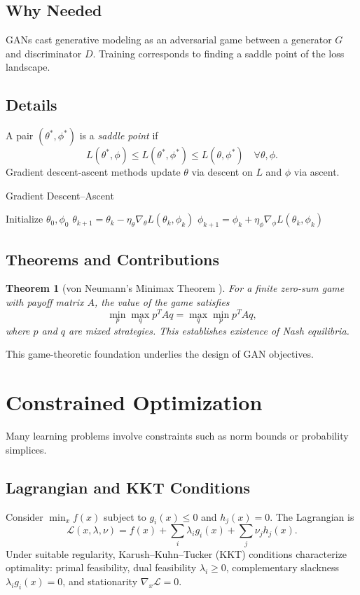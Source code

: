 \documentclass[11pt]{book}
\newtheorem{theorem}{Theorem}[chapter]
\begin{document}
\subsection{Why Needed}
GANs cast generative modeling as an adversarial game between a generator $G$ and discriminator $D$. Training corresponds to finding a saddle point of the loss landscape.

\subsection{Details}
A pair $(\theta^*,\phi^*)$ is a \emph{saddle point} if
\begin{equation}
L(\theta^*,\phi)\le L(\theta^*,\phi^*)\le L(\theta,\phi^*)\quad\forall\theta,\phi.
\end{equation}
Gradient descent-ascent methods update $\theta$ via descent on $L$ and $\phi$ via ascent.

\begin{algorithm}
\caption{Gradient Descent--Ascent}
\begin{algorithmic}[1]
\STATE Initialize $\theta_0, \phi_0$
    \STATE $\theta_{k+1}=\theta_k-\eta_\theta\nabla_{\theta}L(\theta_k,\phi_k)$
    \STATE $\phi_{k+1}=\phi_k+\eta_\phi\nabla_{\phi}L(\theta_k,\phi_k)$
\ENDFOR
\end{algorithmic}
\end{algorithm}

\subsection{Theorems and Contributions}
\begin{theorem}[von Neumann's Minimax Theorem \cite{vonneumann1928}]
For a finite zero-sum game with payoff matrix $A$, the value of the game satisfies
\begin{equation}
\min_{p}\max_{q} p^T A q = \max_{q}\min_{p} p^T A q,
\end{equation}
where $p$ and $q$ are mixed strategies. This establishes existence of Nash equilibria.
\end{theorem}
This game-theoretic foundation underlies the design of GAN objectives.

\section{Constrained Optimization}
Many learning problems involve constraints such as norm bounds or probability simplices.
\subsection{Lagrangian and KKT Conditions}
Consider $\min_x f(x)$ subject to $g_i(x)\le0$ and $h_j(x)=0$. The Lagrangian is
\begin{equation}
\mathcal{L}(x,\lambda,\nu)=f(x)+\sum_i \lambda_i g_i(x)+\sum_j \nu_j h_j(x).
\end{equation}
Under suitable regularity, Karush--Kuhn--Tucker (KKT) conditions characterize optimality: primal feasibility, dual feasibility $\lambda_i\ge0$, complementary slackness $\lambda_i g_i(x)=0$, and stationarity $\nabla_x \mathcal{L}=0$.
\end{document}
